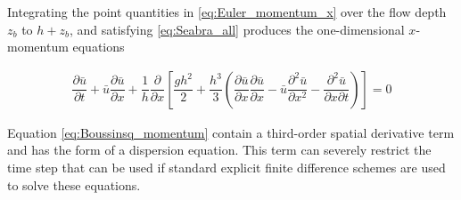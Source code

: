 \documentclass[SingleSpace,12pt]{Serre_ASCE}
\begin{document}
Integrating the point quantities in \eqref{eq:Euler_momentum_x} over the flow depth $z_b$ to $h+z_b$, and satisfying \eqref{eq:Seabra_all} produces the one-dimensional $x$-momentum equations
\begin{linenomath*}
\begin{gather}
\dfrac{\partial \bar{u}}{\partial t} + \bar{u} \dfrac{\partial \bar{u}}{\partial x} + \dfrac{1}{h}\dfrac{\partial}{\partial x} \left [  \dfrac{gh^2}{2} + \dfrac{h^3}{3} \left ( \dfrac{\partial \bar{u}}{\partial x} \dfrac{\partial \bar{u}}{\partial x} - \bar{u} \dfrac{\partial^2\bar{u}}{\partial x^2} - \dfrac{\partial^2\bar{u}}{\partial x \partial t} \right ) \right ] = 0
\label{eq:Boussinsq_momentum}
\end{gather}
\end{linenomath*}
Equation \eqref{eq:Boussinsq_momentum} contain a third-order spatial derivative term and has the form of a dispersion equation. This term can severely restrict the time step that can be used if standard explicit finite difference schemes are used to solve these equations.
\end{document}
